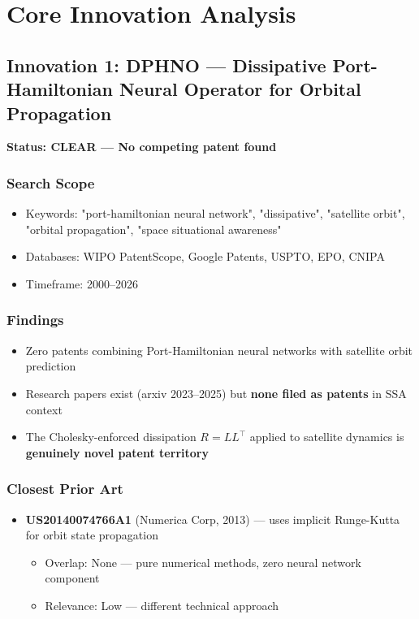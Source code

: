 \documentclass[11pt,a4paper]{article}
\begin{document}
\section{Core Innovation Analysis}

\subsection{Innovation 1: DPHNO — Dissipative Port-Hamiltonian Neural Operator for Orbital Propagation}

\textbf{Status: \textcolor{attgreen}{CLEAR — No competing patent found}}

\subsubsection*{Search Scope}
\begin{itemize}
\item Keywords: "port-hamiltonian neural network", "dissipative", "satellite orbit", "orbital propagation", "space situational awareness"
\item Databases: WIPO PatentScope, Google Patents, USPTO, EPO, CNIPA
\item Timeframe: 2000--2026
\end{itemize}

\subsubsection*{Findings}
\begin{itemize}
\item Zero patents combining Port-Hamiltonian neural networks with satellite orbit prediction
\item Research papers exist (arxiv 2023--2025) but \textbf{none filed as patents} in SSA context
\item The Cholesky-enforced dissipation $R = LL^\top$ applied to satellite dynamics is \textbf{genuinely novel patent territory}
\end{itemize}

\subsubsection*{Closest Prior Art}
\begin{itemize}
\item \textbf{US20140074766A1} (Numerica Corp, 2013) — uses implicit Runge-Kutta for orbit state propagation
  \begin{itemize}
  \item Overlap: None — pure numerical methods, zero neural network component
  \item Relevance: Low — different technical approach
  \end{itemize}
\end{itemize}
\end{document}
